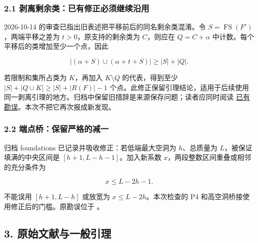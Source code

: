 \documentclass[
  11pt,
  a4paper,
]{article}
\begin{document}
\hypertarget{ux5265ux79bbux5269ux4f59ux7c7bux5df2ux6709ux4feeux6b63ux5fc5ux987bux7ee7ux7eedux6cbfux7528}{%
\clearpage
\subsubsection{2.1
剥离剩余类：已有修正必须继续沿用}\label{ux5265ux79bbux5269ux4f59ux7c7bux5df2ux6709ux4feeux6b63ux5fc5ux987bux7ee7ux7eedux6cbfux7528}}

2026-10-14 的审查已指出旧表述把平移前后的同名剩余类混淆。令
\(S=\operatorname{FS}(F')\)，两端平移之差为 \(t>0\)，原支持的剩余类为
\(C\)，则应在 \(Q=C+\alpha\) 中计数。每个平移后的类增加至少一个点，因此

\[|(\alpha+S)\cup(\alpha+t+S)|\ge|S|+|Q|.\]

若限制和集所占类为 \(K\)，再加入 \(K\setminus Q\) 的代表，得到至少
\(|S|+|Q\cup K|\ge|S|+|R(F)|-1\)
个点。此修正保留引理结论，适用于后续使用同一剥离引理的地方。归档中保留旧措辞是来源保存问题；读者应同时阅读
\href{proof_review_20261014.md}{已有勘误}。本次不把它再次报成新发现。

\hypertarget{ux7aefux70b9ux6865ux4fddux7559ux4e25ux683cux7684ux51cfux4e00}{%
\subsubsection{2.2
端点桥：保留严格的减一}\label{ux7aefux70b9ux6865ux4fddux7559ux4e25ux683cux7684ux51cfux4e00}}

归档 foundations 已记录并吸收修正：若低端最大空洞为 \(h\)、总质量为
\(L\)，被保证填满的中央区间是 \([h+1,L-h-1]\)。加入新系数
\(x\)，两段整数区间重叠或相邻的充分条件为

\[x\le L-2h-1.\]

不能误用 \([h+1,L-h]\) 或放宽为 \(x\le L-2h\)。本次检查的 P4
和高空洞桥接使用修正后的门槛。原勘误位于
。

\hypertarget{ux539fux59cbux6587ux732eux4e0eux4e00ux822cux5f15ux7406}{%
\subsection{3.
原始文献与一般引理}\label{ux539fux59cbux6587ux732eux4e0eux4e00ux822cux5f15ux7406}}
\end{document}
